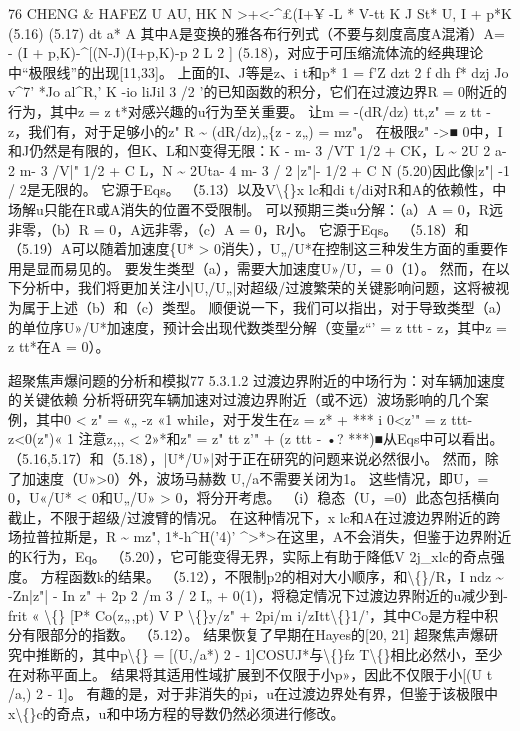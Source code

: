 \documentclass[UTF8,11pt,a4paper,openany,fontset=fandol]{ctexbook}
\begin{document}
76 CHENG \& HAFEZ U AU, HK N >+<-\textasciicircum{}£(I+¥ -L * V-tt K J St* U, I + p*K (5.16) (5.17) dt a* A 其中A是变换的雅各布行列式（不要与刻度高度A混淆）A= - (I + p,K)-\textasciicircum{}[(N-J)(I+p,K)-p 2 L 2 ] (5.18)，对应于可压缩流体流的经典理论中“极限线”的出现[11,33]。 上面的I、J等是z、i t和p* 1 = f'Z dzt 2 f dh f* dzj Jo v\textasciicircum{}7' *Jo al\textasciicircum{}R,' K -io liJil 3 /2 '的已知函数的积分，它们在过渡边界R = 0附近的行为，其中z = z t*对感兴趣的u行为至关重要。 让m = -(dR/dz) tt,z" = z tt - z，我们有，对于足够小的z" R \textasciitilde{} (dR/dz)„\{z - z„) = mz"。 在极限z" ->■ 0中，I和J仍然是有限的，但K、L和N变得无限：K - m- 3 /VT 1/2 + CK，L \textasciitilde{} 2U 2 a- 2 m- 3 /V|" 1/2 + C L，N \textasciitilde{} 2Uta- 4 m- 3 / 2 |z"|- 1/2 + C N (5.20)因此像|z"| -1 / 2是无限的。 它源于Eqs。 （5.13）以及V\textbackslash\{\}x lc和di t/di对R和A的依赖性，中场解u只能在R或A消失的位置不受限制。 可以预期三类u分解：（a）A = 0，R远非零，（b）R = 0，A远非零，（c）A = 0，R小。 它源于Eqs。 （5.18）和（5.19）A可以随着加速度\{U* > 0消失），U„/U*在控制这三种发生方面的重要作用是显而易见的。 要发生类型（a），需要大加速度U»/U，= 0（1）。 然而，在以下分析中，我们将更加关注小|U,/U„|对超级/过渡繁荣的关键影响问题，这将被视为属于上述（b）和（c）类型。 顺便说一下，我们可以指出，对于导致类型（a）的单位序U»/U*加速度，预计会出现代数类型分解（变量z“' = z ttt - z，其中z = z tt*在A = 0）。

超聚焦声爆问题的分析和模拟77 5.3.1.2 过渡边界附近的中场行为：对车辆加速度的关键依赖 分析将研究车辆加速对过渡边界附近（或不远）波场影响的几个案例，其中0 < z" = «„ -z «1 while，对于发生在z = z* + *** i 0<z'" = z ttt-z<0(z")« 1 注意z,,, < 2»*和z" = z" tt z'" + (z ttt - •? ***)■从Eqs中可以看出。 （5.16,5.17）和（5.18），|U*/U»|对于正在研究的问题来说必然很小。 然而，除了加速度（U»>0）外，波场马赫数 U,/a不需要关闭为1。 这些情况，即U，= 0，U«/U* < 0和U„/U» > 0，将分开考虑。 （i）稳态（U，=0）此态包括横向截止，不限于超级/过渡臂的情况。 在这种情况下，x lc和A在过渡边界附近的跨场拉普拉斯是，R \textasciitilde{} mz", 1*-h\textasciicircum{}H('4)' \textasciicircum{}>*>在这里，A不会消失，但鉴于边界附近的K行为，Eq。 （5.20），它可能变得无界，实际上有助于降低V 2j\_xlc的奇点强度。 方程函数k的结果。 （5.12），不限制p2的相对大小顺序，和\textbackslash\{\}/R，I ndz \textasciitilde{} -Zn|z"| - In z" + 2p 2 /m 3 / 2 I„ + 0(1)，将稳定情况下过渡边界附近的u减少到- frit « \textbackslash\{\} [P* Co(z„,pt) V P \textbackslash\{\}y/z" + 2pi/m i/zItt\textbackslash\{\}1/'，其中Co是方程中积分有限部分的指数。 （5.12）。 结果恢复了早期在Hayes的[20, 21] 超聚焦声爆研究中推断的，其中p\textbackslash\{\} = [(U,/a*) 2 - 1]COSUJ*与\textbackslash\{\}fz T\textbackslash\{\}相比必然小，至少在对称平面上。 结果将其适用性域扩展到不仅限于小p»，因此不仅限于小[(U t /a,) 2 - 1]。 有趣的是，对于非消失的pi，u在过渡边界处有界，但鉴于该极限中x\textbackslash\{\}c的奇点，u和中场方程的导数仍然必须进行修改。
\end{document}
